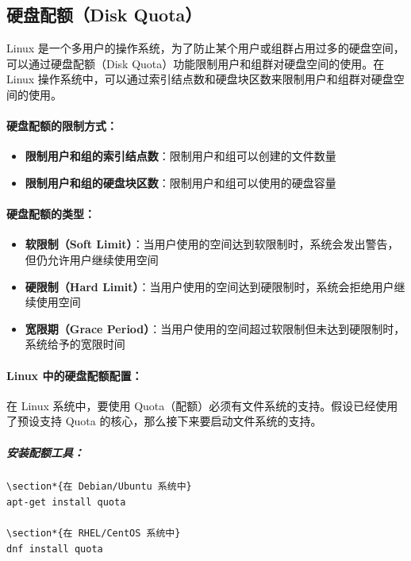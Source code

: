 \documentclass[12pt,UTF8]{ctexbook}
\begin{document}
\subsection{硬盘配额（Disk Quota）}
\label{disk\_quota}

Linux 是一个多用户的操作系统，为了防止某个用户或组群占用过多的硬盘空间，可以通过硬盘配额（Disk Quota）功能限制用户和组群对硬盘空间的使用。在 Linux 操作系统中，可以通过索引结点数和硬盘块区数来限制用户和组群对硬盘空间的使用。

\paragraph{硬盘配额的限制方式：}
\begin{itemize}
    \item \textbf{限制用户和组的索引结点数}：限制用户和组可以创建的文件数量
    \item \textbf{限制用户和组的硬盘块区数}：限制用户和组可以使用的硬盘容量
\end{itemize}

\paragraph{硬盘配额的类型：}
\begin{itemize}
    \item \textbf{软限制（Soft Limit）}：当用户使用的空间达到软限制时，系统会发出警告，但仍允许用户继续使用空间
    \item \textbf{硬限制（Hard Limit）}：当用户使用的空间达到硬限制时，系统会拒绝用户继续使用空间
    \item \textbf{宽限期（Grace Period）}：当用户使用的空间超过软限制但未达到硬限制时，系统给予的宽限时间
\end{itemize}

\paragraph{Linux 中的硬盘配额配置：}
在 Linux 系统中，要使用 Quota（配额）必须有文件系统的支持。假设已经使用了预设支持 Quota 的核心，那么接下来要启动文件系统的支持。

\subparagraph{安装配额工具：}
\begin{verbatim}
\section*{在 Debian/Ubuntu 系统中}
apt-get install quota

\section*{在 RHEL/CentOS 系统中}
dnf install quota
\end{verbatim}
\end{document}
